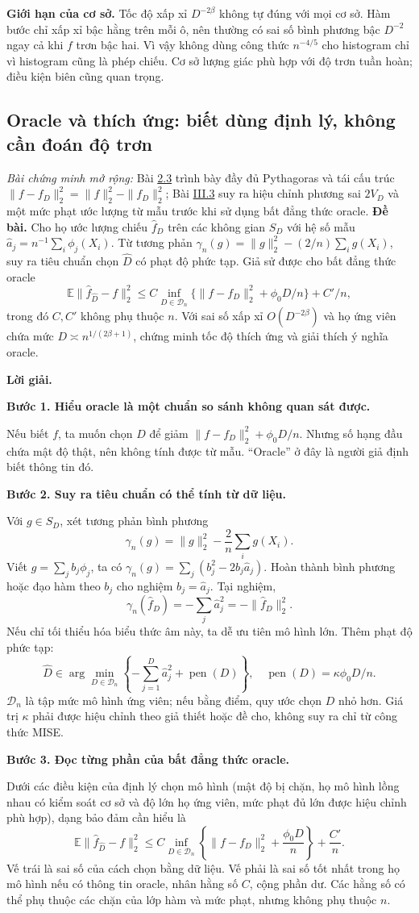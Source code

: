 \documentclass[11pt,a4paper]{article}
\newcommand{\E}{\mathbb E}
\newcommand{\buoc}[1]{\par\medskip\textbf{#1}\par}
\begin{document}
\textbf{Giới hạn của cơ sở.} Tốc độ xấp xỉ $D^{-2\beta}$ không tự đúng với mọi cơ sở. Hàm bước chỉ xấp xỉ bậc hằng trên mỗi ô, nên thường có sai số bình phương bậc $D^{-2}$ ngay cả khi $f$ trơn bậc hai. Vì vậy không dùng công thức $n^{-4/5}$ cho histogram chỉ vì histogram cũng là phép chiếu. Cơ sở lượng giác phù hợp với độ trơn tuần hoàn; điều kiện biên cũng quan trọng.

\subsection{Oracle và thích ứng: biết dùng định lý, không cần đoán độ trơn}\label{sec:oracle}
\textit{Bài chứng minh mở rộng:} Bài \hyperref[ot45:pythagoras]{2.3} trình bày
đầy đủ Pythagoras và tái cấu trúc $\|f-f_D\|_2^2=\|f\|_2^2-\|f_D\|_2^2$;
Bài \hyperref[ot45:oracle]{III.3} suy ra hiệu chỉnh phương sai $2V_D$
và một mức phạt ước lượng từ mẫu trước khi sử dụng bất đẳng thức oracle.
\textbf{Đề bài.} Cho họ ước lượng chiếu $\widehat f_D$ trên các không gian
$S_D$ với hệ số mẫu $\widehat a_j=n^{-1}\sum_i\phi_j(X_i)$.
Từ tương phản $\gamma_n(g)=\|g\|_2^2-(2/n)\sum_i g(X_i)$,
suy ra tiêu chuẩn chọn $\widehat D$ có phạt độ phức tạp.
Giả sử được cho bất đẳng thức oracle
\[
\E\|\widehat f_{\widehat D}-f\|_2^2
\leq C\inf_{D\in\mathcal D_n}\{\|f-f_D\|_2^2+\phi_0D/n\}+C'/n,
\]
trong đó $C,C'$ không phụ thuộc $n$.
Với sai số xấp xỉ $O(D^{-2\beta})$ và họ ứng viên chứa mức
$D\asymp n^{1/(2\beta+1)}$, chứng minh tốc độ thích ứng và giải thích ý nghĩa oracle.

\textbf{Lời giải.}
\buoc{Bước 1. Hiểu oracle là một chuẩn so sánh không quan sát được.}
Nếu biết $f$, ta muốn chọn $D$ để giảm $\|f-f_D\|_2^2+\phi_0D/n$. Nhưng số hạng đầu chứa mật độ thật, nên không tính được từ mẫu. ``Oracle'' ở đây là người giả định biết thông tin đó.
\buoc{Bước 2. Suy ra tiêu chuẩn có thể tính từ dữ liệu.}
Với $g\in S_D$, xét tương phản bình phương
\[
\gamma_n(g)=\|g\|_2^2-\frac2n\sum_i g(X_i).
\]
Viết $g=\sum_jb_j\phi_j$, ta có $\gamma_n(g)=\sum_j(b_j^2-2b_j\widehat a_j)$. Hoàn thành bình phương hoặc đạo hàm theo $b_j$ cho nghiệm $b_j=\widehat a_j$. Tại nghiệm,
\[
\gamma_n(\widehat f_D)=-\sum_j\widehat a_j^2=-\|\widehat f_D\|_2^2.
\]
Nếu chỉ tối thiểu hóa biểu thức âm này, ta dễ ưu tiên mô hình lớn. Thêm phạt độ phức tạp:
\[
\boxed{\widehat D\in\arg\min_{D\in\mathcal D_n}
\left\{-\sum_{j=1}^D\widehat a_j^2+\operatorname{pen}(D)\right\},
\quad\operatorname{pen}(D)=\kappa\phi_0D/n.}
\]
$\mathcal D_n$ là tập mức mô hình ứng viên; nếu bằng điểm, quy ước chọn $D$ nhỏ hơn. Giá trị $\kappa$ phải được hiệu chỉnh theo giả thiết hoặc đề cho, không suy ra chỉ từ công thức MISE.
\buoc{Bước 3. Đọc từng phần của bất đẳng thức oracle.}
Dưới các điều kiện của định lý chọn mô hình (mật độ bị chặn, họ mô hình lồng nhau có kiểm soát cơ sở và độ lớn họ ứng viên, mức phạt đủ lớn được hiệu chỉnh phù hợp), dạng bảo đảm cần hiểu là
\[
\boxed{\E\|\widehat f_{\widehat D}-f\|_2^2
\leq C\inf_{D\in\mathcal D_n}\left\{\|f-f_D\|_2^2+\frac{\phi_0D}{n}\right\}+\frac{C'}n.}
\]
Vế trái là sai số của cách chọn bằng dữ liệu. Vế phải là sai số tốt nhất trong họ mô hình nếu có thông tin oracle, nhân hằng số $C$, cộng phần dư. Các hằng số có thể phụ thuộc các chặn của lớp hàm và mức phạt, nhưng không phụ thuộc $n$.
\end{document}
